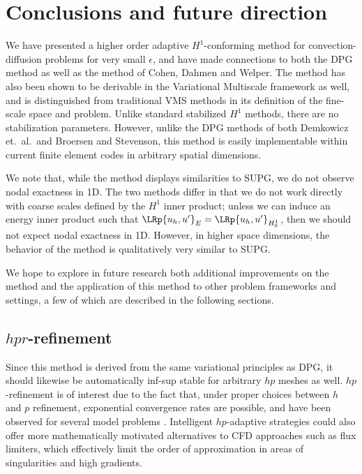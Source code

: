 
\section{Conclusions and future direction}

We have presented a higher order adaptive $H^1$-conforming method for convection-diffusion problems for very small $\epsilon$, and have made connections to both the DPG method as well as the method of Cohen, Dahmen and Welper.  The method has also been shown to be derivable in the Variational Multiscale framework as well, and is distinguished from traditional VMS methods in its definition of the fine-scale space and problem.  Unlike standard stabilized $H^1$ methods, there are no stabilization parameters.  However, unlike the DPG methods of both Demkowicz et.\ al.\ and Broersen and Stevenson, this method is easily implementable within current finite element codes in arbitrary spatial dimensions.

We note that, while the method displays similarities to SUPG, we do not observe nodal exactness in 1D.  The two methods differ in that we do not work directly with coarse scales defined by the $H^1$ inner product; unless we can induce an energy inner product such that $\LRp{u_h,u'}_E = \LRp{u_h,u'}_{H^1_0}$, then we should not expect nodal exactness in 1D.  However, in higher space dimensions, the behavior of the method is qualitatively very similar to SUPG.  

We hope to explore in future research both additional improvements on the method and the application of this method to other problem frameworks and settings, a few of which are described in the following sections.  

\subsection{$hpr$-refinement}

Since this method is derived from the same variational principles as DPG, it should likewise be automatically inf-sup stable for arbitrary $hp$ meshes as well.  $hp$-refinement is of interest due to the fact that, under proper choices between $h$ and $p$ refinement, exponential convergence rates are possible, and have been observed for several model problems \cite{demkowicz2006computing}.  Intelligent $hp$-adaptive strategies could also offer more mathematically motivated alternatives to CFD approaches such as flux limiters, which effectively limit the order of approximation in areas of singularities and high gradients.  


